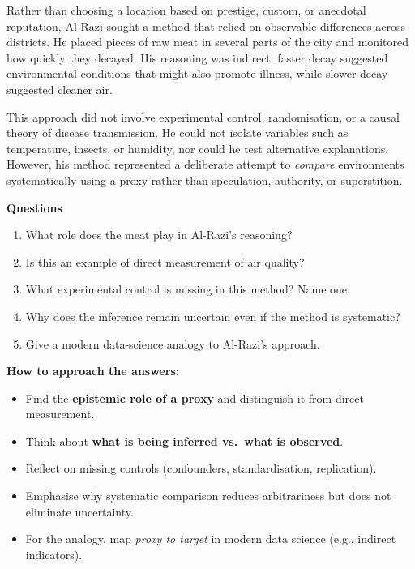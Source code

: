 \documentclass[
  12pt,
]{book}
\providecommand{\tightlist}{%
  \setlength{\itemsep}{0pt}\setlength{\parskip}{0pt}}
\begin{document}
Rather than choosing a location based on prestige, custom, or anecdotal reputation, Al-Razi sought a method that relied on observable differences across districts. He placed pieces of raw meat in several parts of the city and monitored how quickly they decayed. His reasoning was indirect: faster decay suggested environmental conditions that might also promote illness, while slower decay suggested cleaner air.

This approach did not involve experimental control, randomisation, or a causal theory of disease transmission. He could not isolate variables such as temperature, insects, or humidity, nor could he test alternative explanations. However, his method represented a deliberate attempt to \emph{compare} environments systematically using a proxy rather than speculation, authority, or superstition.

\textbf{Questions}

\begin{enumerate}
\def\labelenumi{\arabic{enumi}.}
\tightlist
\item
  What role does the meat play in Al-Razi's reasoning?\\
\item
  Is this an example of direct measurement of air quality?\\
\item
  What experimental control is missing in this method? Name one.\\
\item
  Why does the inference remain uncertain even if the method is systematic?\\
\item
  Give a modern data-science analogy to Al-Razi's approach.
\end{enumerate}

\textbf{How to approach the answers:}

\begin{itemize}
\tightlist
\item
  Find the \textbf{epistemic role of a proxy} and distinguish it from direct measurement.
\item
  Think about \textbf{what is being inferred vs.~what is observed}.
\item
  Reflect on missing controls (confounders, standardisation, replication).
\item
  Emphasise why systematic comparison reduces arbitrariness but does not eliminate uncertainty.
\item
  For the analogy, map \emph{proxy to target} in modern data science (e.g., indirect indicators).
\end{itemize}
\end{document}

